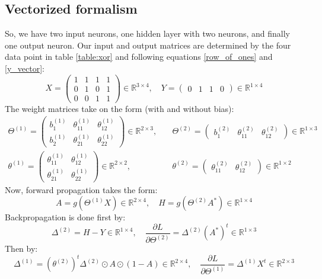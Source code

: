 \documentclass[12pt, a4paper]{article}
\numberwithin{equation}{section}
\begin{document}
\subsection{Vectorized formalism}
So, we have two input neurons, one hidden layer with two neurons, and finally one output neuron. Our input and output matrices are determined by the four data point in table \ref{table:xor} and following equations \ref{row_of_ones} and \ref{y_vector}:
\begin{equation}
X=
\begin{pmatrix}
1 & 1 & 1 & 1 \\
0 & 1 & 0 & 1 \\
0 & 0 & 1 & 1
\end{pmatrix}\in\mathbb{R}^{3\times 4},\quad
Y=
\begin{pmatrix}
0 & 1 & 1 & 0
\end{pmatrix}\in\mathbb{R}^{1\times 4}
\end{equation}
The weight matrices take on the form (with and without bias):
\begin{align}
\Theta^{(1)}=
\begin{pmatrix}
b_1^{(1)} & \theta_{11}^{(1)} & \theta_{12}^{(1)} \\
b_2^{(1)} & \theta_{21}^{(1)} & \theta_{22}^{(1)}
\end{pmatrix}\in\mathbb{R}^{2\times 3},&\quad
\Theta^{(2)}=
\begin{pmatrix}
b_1^{(2)} & \theta_{11}^{(2)} & \theta_{12}^{(2)}
\end{pmatrix}\in\mathbb{R}^{1\times 3} \\
\theta^{(1)}=
\begin{pmatrix}
\theta_{11}^{(1)} & \theta_{12}^{(1)} \\
\theta_{21}^{(1)} & \theta_{22}^{(1)}
\end{pmatrix}\in\mathbb{R}^{2\times 2},&\quad
\theta^{(2)}=
\begin{pmatrix}
\theta_{11}^{(2)} & \theta_{12}^{(2)}
\end{pmatrix}\in\mathbb{R}^{1\times 2}
\end{align}
Now, forward propagation takes the form:
\begin{equation}
A=g(\Theta^{(1)}X)\in\mathbb{R}^{2\times 4},\quad H=g(\Theta^{(2)}A^*)\in\mathbb{R}^{1\times 4}
\end{equation}
Backpropagation is done first by:
\begin{equation}
\Delta^{(2)}=H-Y\in\mathbb{R}^{1\times 4},\quad\frac{\partial L}{\partial\Theta^{(2)}}=\Delta^{(2)}(A^*)^t\in\mathbb{R}^{1\times 3}
\end{equation}
Then by:
\begin{equation}
\Delta^{(1)}=\left(\theta^{(2)}\right)^t\Delta^{(2)}\odot A\odot(1-A)\in\mathbb{R}^{2\times 4},\quad
\frac{\partial L}{\partial\Theta^{(1)}}=\Delta^{(1)}X^t\in\mathbb{R}^{2\times 3}
\end{equation}
\end{document}
